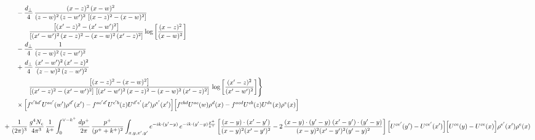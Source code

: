 \documentclass[10pt]{article}
\numberwithin{equation}{section}
\begin{document}
\begin{align}
&\qquad-\frac{d_{\perp}}{4}\,\frac{(x-z)^{2}\, (x-w)^{2}}{(z-w)^{2}\, (z-w^{\prime})^{2}\,\left[(x-z)^{2} - (x-w)^{2}\right]}\notag\\&\qquad\qquad  \frac{\left[(x^{\prime}-z)^{2}-(x^{\prime}-w^{\prime})^{2}\right]}{\left[(x^{\prime}-w^{\prime})^{2}\, (x-z)^{2} - (x-w)^{2}\, (x^{\prime}-z)^{2}\right]} \log{\left[\frac{(x-z)^{2}}{(x-w)^{2}}\right]}\notag\\
&\qquad-\frac{d_{\perp}}{4}\,\frac{1}{(z-w)^{2}\, (z-w^{\prime})^{2}}\notag\\
&\qquad+\frac{d_{\perp}}{4}\,\frac{(x^{\prime}-w^{\prime})^{2}\, (x^{\prime}-z)^{2}}{(z-w)^{2}\, (z-w^{\prime})^{2}}\notag\\&\qquad\qquad  \frac{\left[(x-z)^{2} - (x-w)^{2}\right]}{\left[(x^{\prime}-z)^{2} - (x^{\prime}-w^{\prime})^{2}\right]\, \left[(x^{\prime}-w^{\prime})^{2}\, (x - z)^{2} - (x-w)^{2}\,(x^{\prime}-z)^{2}\right]}\, \log{\left[\frac{(x^{\prime}-z)^{2}}{(x^{\prime}-w^{\prime})^{2}}\right]}\Bigg\}\notag\\&\qquad\times\Big[f^{c^{\prime}bd^{\prime}}U^{ac^{\prime}}(w^{\prime})\rho^{d^{\prime}}(x^{\prime})-f^{ac^{\prime}d^{\prime}}U^{c^{\prime}b}(z)U^{d^{\prime}e^{\prime}}(x^{\prime})\rho^{e^{\prime}}(x^{\prime})\Big]\Big[f^{cbd}U^{ac}(w)\rho^{d}(x)-f^{acd}U^{cb}(z)U^{de}(x)\rho^{e}(x)\Big]\notag\\[6pt]
&+\frac{1}{(2\pi)^{3}}\,\frac{g^{4}N_{c}}{4\pi^{3}}\,\frac{1}{k^{+}}\int_{0}^{\vee-k^{+}}\frac{dp^{+}}{2\pi}\,\frac{p^{+}}{(p^{+}+k^{+})^{2}}\int_{x,y,x^{\prime},y^{\prime}}e^{-ik\cdot(y^{\prime}-y)}\,e^{-ik\cdot(y^{\prime}-y)\frac{p^{+}}{k^{+}}}\,\bigg[\frac{(x-y)\cdot(x^{\prime}-y^{\prime})}{(x-y)^{2}(x^{\prime}-y^{\prime})^{2}}-2\,\frac{(x-y)\cdot(y^{\prime}-y)\;(x^{\prime}-y^{\prime})\cdot(y^{\prime}-y)}{(x-y)^{2}(x^{\prime}-y^{\prime})^{2}(y^{\prime}-y)^{2}}\bigg]\,\Big[U^{ce^{\prime}}(y^{\prime})-U^{ce^{\prime}}(x^{\prime})\Big]\Big[U^{ce}(y)-U^{ce}(x)\Big]\rho^{e^{\prime}}(x^{\prime})\rho^{e}(x)
\end{align}
\newpage
\end{document}
